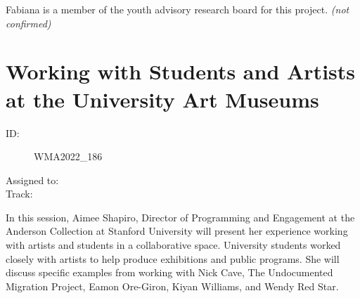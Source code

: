 \documentclass{report}
\begin{document}
                

                Fabiana is a member of the youth advisory research board for this project.
                \emph{ (not confirmed) }
              

              

              
        
          \newpage
          \section{ Working with Students and Artists at the University Art Museums }
            \begin{description}
              \item [ID:]
              WMA2022\_186

              \item [Assigned to:]
                \item [Track:]
              \end{description}

              In this session, Aimee Shapiro, Director of Programming and Engagement at the Anderson Collection at Stanford University will present her experience working with artists and students in a collaborative space. University students worked closely with artists to help produce exhibitions and public programs. She will discuss specific examples from working with Nick Cave, The Undocumented Migration Project, Eamon Ore-Giron, Kiyan Williams, and Wendy Red Star.
\end{document}

